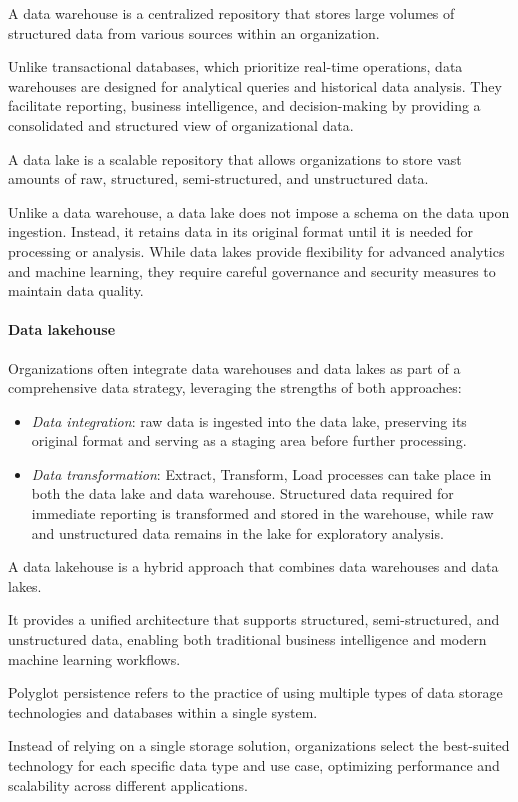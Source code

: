 \begin{definition}
    A data warehouse is a centralized repository that stores large volumes of structured data from various sources within an organization.
\end{definition}
\noindent Unlike transactional databases, which prioritize real-time operations, data warehouses are designed for analytical queries and historical data analysis. 
They facilitate reporting, business intelligence, and decision-making by providing a consolidated and structured view of organizational data.
\begin{definition}
    A data lake is a scalable repository that allows organizations to store vast amounts of raw, structured, semi-structured, and unstructured data.
\end{definition}
\noindent Unlike a data warehouse, a data lake does not impose a schema on the data upon ingestion. 
Instead, it retains data in its original format until it is needed for processing or analysis.
While data lakes provide flexibility for advanced analytics and machine learning, they require careful governance and security measures to maintain data quality.

\paragraph*{Data lakehouse}
Organizations often integrate data warehouses and data lakes as part of a comprehensive data strategy, leveraging the strengths of both approaches:
\begin{itemize}
    \item \textit{Data integration}: raw data is ingested into the data lake, preserving its original format and serving as a staging area before further processing.
    \item \textit{Data transformation}: Extract, Transform, Load processes can take place in both the data lake and data warehouse. 
        Structured data required for immediate reporting is transformed and stored in the warehouse, while raw and unstructured data remains in the lake for exploratory analysis.
\end{itemize}
\begin{definition}
    A data lakehouse is a hybrid approach that combines data warehouses and data lakes.
\end{definition}
\noindent It provides a unified architecture that supports structured, semi-structured, and unstructured data, enabling both traditional business intelligence and modern machine learning workflows.
\begin{definition}
    Polyglot persistence refers to the practice of using multiple types of data storage technologies and databases within a single system. 
\end{definition}
\noindent Instead of relying on a single storage solution, organizations select the best-suited technology for each specific data type and use case, optimizing performance and scalability across different applications.

